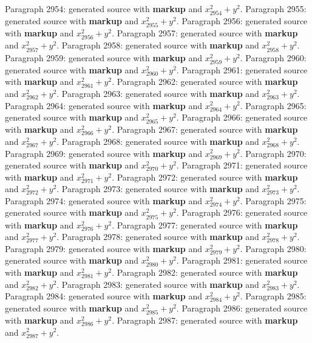 \documentclass{article}
\begin{document}
Paragraph 2954: generated source with \textbf{markup} and $x_{2954}^2 + y^2$.
Paragraph 2955: generated source with \textbf{markup} and $x_{2955}^2 + y^2$.
Paragraph 2956: generated source with \textbf{markup} and $x_{2956}^2 + y^2$.
Paragraph 2957: generated source with \textbf{markup} and $x_{2957}^2 + y^2$.
Paragraph 2958: generated source with \textbf{markup} and $x_{2958}^2 + y^2$.
Paragraph 2959: generated source with \textbf{markup} and $x_{2959}^2 + y^2$.
Paragraph 2960: generated source with \textbf{markup} and $x_{2960}^2 + y^2$.
Paragraph 2961: generated source with \textbf{markup} and $x_{2961}^2 + y^2$.
Paragraph 2962: generated source with \textbf{markup} and $x_{2962}^2 + y^2$.
Paragraph 2963: generated source with \textbf{markup} and $x_{2963}^2 + y^2$.
Paragraph 2964: generated source with \textbf{markup} and $x_{2964}^2 + y^2$.
Paragraph 2965: generated source with \textbf{markup} and $x_{2965}^2 + y^2$.
Paragraph 2966: generated source with \textbf{markup} and $x_{2966}^2 + y^2$.
Paragraph 2967: generated source with \textbf{markup} and $x_{2967}^2 + y^2$.
Paragraph 2968: generated source with \textbf{markup} and $x_{2968}^2 + y^2$.
Paragraph 2969: generated source with \textbf{markup} and $x_{2969}^2 + y^2$.
Paragraph 2970: generated source with \textbf{markup} and $x_{2970}^2 + y^2$.
Paragraph 2971: generated source with \textbf{markup} and $x_{2971}^2 + y^2$.
Paragraph 2972: generated source with \textbf{markup} and $x_{2972}^2 + y^2$.
Paragraph 2973: generated source with \textbf{markup} and $x_{2973}^2 + y^2$.
Paragraph 2974: generated source with \textbf{markup} and $x_{2974}^2 + y^2$.
Paragraph 2975: generated source with \textbf{markup} and $x_{2975}^2 + y^2$.
Paragraph 2976: generated source with \textbf{markup} and $x_{2976}^2 + y^2$.
Paragraph 2977: generated source with \textbf{markup} and $x_{2977}^2 + y^2$.
Paragraph 2978: generated source with \textbf{markup} and $x_{2978}^2 + y^2$.
Paragraph 2979: generated source with \textbf{markup} and $x_{2979}^2 + y^2$.
Paragraph 2980: generated source with \textbf{markup} and $x_{2980}^2 + y^2$.
Paragraph 2981: generated source with \textbf{markup} and $x_{2981}^2 + y^2$.
Paragraph 2982: generated source with \textbf{markup} and $x_{2982}^2 + y^2$.
Paragraph 2983: generated source with \textbf{markup} and $x_{2983}^2 + y^2$.
Paragraph 2984: generated source with \textbf{markup} and $x_{2984}^2 + y^2$.
Paragraph 2985: generated source with \textbf{markup} and $x_{2985}^2 + y^2$.
Paragraph 2986: generated source with \textbf{markup} and $x_{2986}^2 + y^2$.
Paragraph 2987: generated source with \textbf{markup} and $x_{2987}^2 + y^2$.
\end{document}
